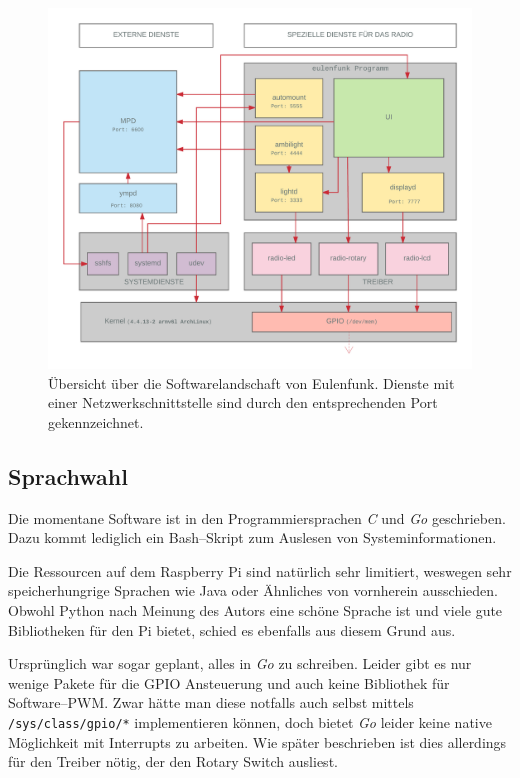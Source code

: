\documentclass[11pt,ngerman,toc=listof,index=totoc]{scrreprt}
\begin{document}
\begin{figure}[h!]
  \centering
  \includegraphics[width=1.0\textwidth]{images/eulenfunk-services.png}
  \caption{Übersicht über die Softwarelandschaft von Eulenfunk. Dienste mit
  einer Netzwerkschnittstelle sind durch den entsprechenden Port gekennzeichnet.}
  \label{eulenfunk-services}
\end{figure}

\subsection{Sprachwahl}\label{sprachwahl}

Die momentane Software ist in den Programmiersprachen \emph{C} und
\emph{Go} geschrieben. Dazu kommt lediglich ein Bash--Skript zum
Auslesen von Systeminformationen.

Die Ressourcen auf dem Raspberry Pi sind natürlich sehr limitiert,
weswegen sehr speicherhungrige Sprachen wie Java oder Ähnliches von
vornherein ausschieden. Obwohl Python nach Meinung des Autors eine
schöne Sprache ist und viele gute Bibliotheken für den Pi bietet, schied
es ebenfalls aus diesem Grund aus.

Ursprünglich war sogar geplant, alles in \emph{Go} zu schreiben. Leider
gibt es nur wenige Pakete für die GPIO Ansteuerung und auch keine
Bibliothek für Software--PWM. Zwar hätte man diese notfalls auch selbst
mittels \texttt{/sys/class/gpio/*} implementieren können, doch bietet
\emph{Go} leider keine native Möglichkeit mit Interrupts zu arbeiten.
Wie später beschrieben ist dies allerdings für den Treiber nötig, der
den Rotary Switch ausliest.
\end{document}
